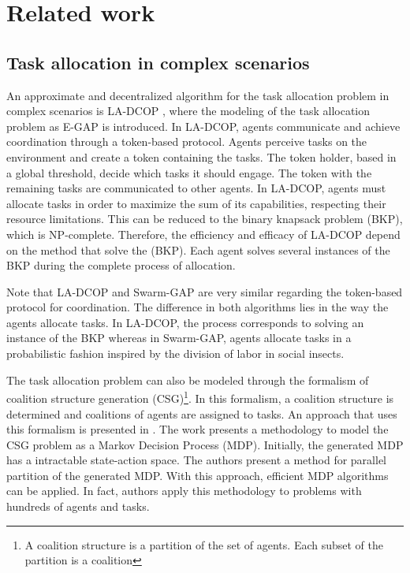 \documentclass[conference]{IEEEtran}
\begin{document}
\section{Related work}
\label{sec:related}

\subsection{Task allocation in complex scenarios}
\label{sec:related_ta}

An approximate and decentralized algorithm for the task allocation problem in complex scenarios is LA-DCOP \cite{Scerri+2005}, where the modeling of the task allocation problem as E-GAP is introduced. In LA-DCOP, agents communicate and achieve coordination through a token-based protocol. Agents perceive tasks on the environment and create a token containing the tasks. The token holder, based in a global threshold, decide which tasks it should engage. The token with the remaining tasks are communicated to other agents. In LA-DCOP, agents must allocate tasks in order to maximize the sum of its capabilities, respecting their resource limitations. This can be reduced to the binary knapsack problem (BKP), which is NP-complete. Therefore, the efficiency and efficacy of LA-DCOP depend on the method that solve the (BKP). Each agent solves several instances of the BKP during the complete process of allocation.

Note that LA-DCOP and Swarm-GAP are very similar regarding the token-based protocol for coordination. The difference in both algorithms lies in the way the agents allocate tasks. In LA-DCOP, the process corresponds to solving an instance of the BKP whereas in Swarm-GAP, agents allocate tasks in a probabilistic fashion inspired by the division of labor in social insects.

The task allocation problem can also be modeled through the formalism of coalition structure generation (CSG)\footnote{A coalition structure is a partition of the set of agents. Each subset of the partition is a coalition}. In this formalism, a coalition structure is determined and coalitions of agents are assigned to tasks. An approach that uses this formalism is presented in \cite{Khan+2011}. The work presents a methodology to model the CSG problem as a Markov Decision Process (MDP). Initially, the generated MDP has a intractable state-action space. The authors present a method for parallel partition of the generated MDP. With this approach, efficient MDP algorithms can be applied. In fact, authors apply this methodology to problems with hundreds of agents and tasks.
\end{document}

